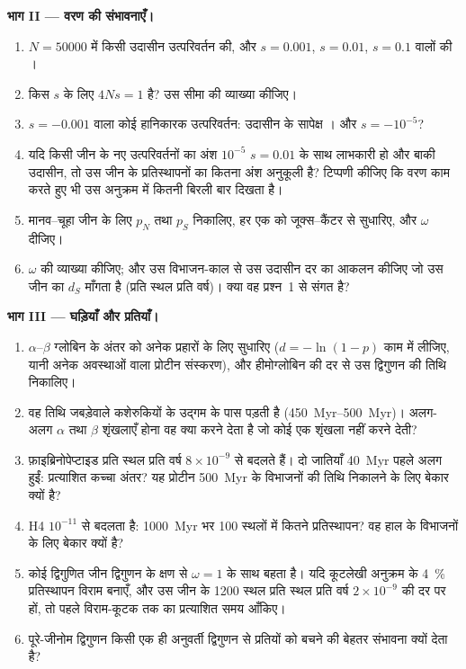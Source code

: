 \begin{problem}
\medskip
\noindent\textbf{भाग II --- वरण की संभावनाएँ।}
\begin{enumerate}[resume]
  \item $N = \num{50000}$ में किसी उदासीन उत्परिवर्तन की, और $s = 0.001$,
        $s = 0.01$, $s = 0.1$ वालों की ।
  \item किस $s$ के लिए $4Ns = 1$ है? उस सीमा की व्याख्या कीजिए।
  \item $s = -0.001$ वाला कोई हानिकारक उत्परिवर्तन: उदासीन के सापेक्ष
        । और $s = -10^{-5}$?
  \item यदि किसी जीन के नए उत्परिवर्तनों का अंश $10^{-5}$ $s = 0.01$ के
        साथ लाभकारी हो और बाकी उदासीन, तो उस जीन के प्रतिस्थापनों का
        कितना अंश अनुकूली है? टिप्पणी कीजिए कि वरण काम करते हुए भी उस
        अनुक्रम में कितनी बिरली बार दिखता है।
  \item मानव--चूहा जीन के लिए $p_{N}$ तथा $p_{S}$ निकालिए, हर एक को
        जूक्स--कैंटर से सुधारिए, और $\omega$ दीजिए।
  \item $\omega$ की व्याख्या कीजिए; और उस विभाजन-काल से उस उदासीन दर का
        आकलन कीजिए जो उस जीन का $d_{S}$ माँगता है (प्रति स्थल प्रति
        वर्ष)। क्या वह प्रश्न~1 से संगत है?
\end{enumerate}

\medskip
\noindent\textbf{भाग III --- घड़ियाँ और प्रतियाँ।}
\begin{enumerate}[resume]
  \item $\alpha$--$\beta$ ग्लोबिन के अंतर को अनेक प्रहारों के लिए
        सुधारिए ($d = -\ln(1 - p)$ काम में लीजिए, यानी अनेक अवस्थाओं
        वाला प्रोटीन संस्करण), और हीमोग्लोबिन की दर से उस द्विगुणन की
        तिथि निकालिए।
  \item वह तिथि जबड़ेवाले कशेरुकियों के उद्गम के पास पड़ती है
        (\qtyrange{450}{500}{Myr})। अलग-अलग $\alpha$ तथा $\beta$
        शृंखलाएँ होना वह क्या करने देता है जो कोई एक शृंखला नहीं करने
        देती?
  \item फ़ाइब्रिनोपेप्टाइड प्रति स्थल प्रति वर्ष $8\times 10^{-9}$ से
        बदलते हैं। दो जातियाँ \qty{40}{Myr} पहले अलग हुईं: प्रत्याशित
        कच्चा अंतर? यह प्रोटीन \qty{500}{Myr} के विभाजनों की तिथि
        निकालने के लिए बेकार क्यों है?
  \item {} H4 $10^{-11}$ से बदलता है: \qty{1000}{Myr} भर 100
        स्थलों में कितने प्रतिस्थापन? वह हाल के विभाजनों के लिए बेकार
        क्यों है?
  \item कोई द्विगुणित जीन द्विगुणन के क्षण से $\omega = 1$ के साथ बहता
        है। यदि कूटलेखी अनुक्रम के \qty{4}{\%} प्रतिस्थापन विराम बनाएँ,
        और उस जीन के 1200 स्थल प्रति स्थल प्रति वर्ष $2\times
        10^{-9}$ की दर पर हों, तो पहले विराम-कूटक तक का प्रत्याशित समय
        आँकिए।
  \item पूरे-जीनोम द्विगुणन किसी एक ही अनुवर्ती द्विगुणन से प्रतियों को
        बचने की बेहतर संभावना क्यों देता है?
\end{enumerate}


\end{problem}
